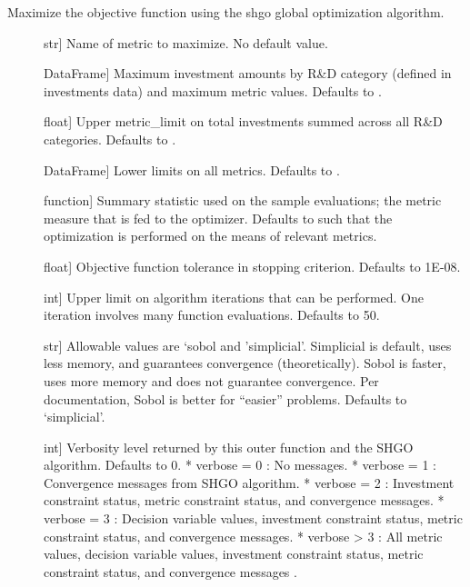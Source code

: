 \documentclass[letterpaper,10pt,english]{sphinxmanual}
\begin{document}
Maximize the objective function using the shgo global optimization
algorithm.

\begin{description}
\item[{}] \leavevmode{[}str{]}
Name of metric to maximize. No default value.

\item[{}] \leavevmode{[}DataFrame{]}
Maximum investment amounts by R\&D category (defined in investments
data) and maximum metric values. Defaults to .

\item[{}] \leavevmode{[}float{]}
Upper metric\_limit on total investments summed across all R\&D
categories. Defaults to .

\item[{}] \leavevmode{[}DataFrame{]}
Lower limits on all metrics. Defaults to .

\item[{}] \leavevmode{[}function{]}
Summary statistic used on the sample evaluations; the metric measure
that is fed to the optimizer. Defaults to  such that the
optimization is performed on the means of relevant metrics.

\item[{}] \leavevmode{[}float{]}
Objective function tolerance in stopping criterion. Defaults to
1E-08.

\item[{}] \leavevmode{[}int{]}
Upper limit on algorithm iterations that can be performed. One
iteration involves many function evaluations. Defaults to 50.

\item[{}] \leavevmode{[}str{]}
Allowable values are ‘sobol and ’simplicial’. Simplicial is default,
uses less memory, and guarantees convergence (theoretically). Sobol
is faster, uses more memory and does not guarantee convergence. Per
documentation, Sobol is better for “easier” problems. Defaults to
‘simplicial’.

\item[{}] \leavevmode{[}int{]}
Verbosity level returned by this outer function and the SHGO algorithm. Defaults to 0.
*  verbose = 0 : No messages.
*  verbose = 1 : Convergence messages from SHGO algorithm.
*  verbose = 2 : Investment constraint status, metric constraint status, and convergence messages.
*  verbose = 3 : Decision variable values, investment constraint status, metric constraint status, and convergence messages.
*  verbose \textgreater{} 3 : All metric values, decision variable values, investment constraint status, metric constraint status, and convergence messages .

\end{description}
\end{document}
